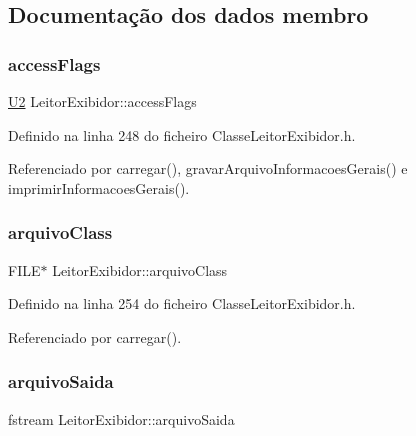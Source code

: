 \subsection{Documentação dos dados membro}
\mbox{\label{classLeitorExibidor_a16d6ecbc6b367cda3c0b774505285665}} 
\subsubsection{\texorpdfstring{access\+Flags}{accessFlags}}
{\footnotesize\ttfamily \hyperlink{BasicTypes_8h_a90240657108b1b457eef9d3f76e0202e}{U2} Leitor\+Exibidor\+::access\+Flags\hspace{0.3cm}{\ttfamily [private]}}



Definido na linha 248 do ficheiro Classe\+Leitor\+Exibidor.\+h.



Referenciado por carregar(), gravar\+Arquivo\+Informacoes\+Gerais() e imprimir\+Informacoes\+Gerais().

\mbox{\label{classLeitorExibidor_acbb3d188113d55cc00b6e92bf2fddb98}} 
\subsubsection{\texorpdfstring{arquivo\+Class}{arquivoClass}}
{\footnotesize\ttfamily F\+I\+LE$\ast$ Leitor\+Exibidor\+::arquivo\+Class\hspace{0.3cm}{\ttfamily [private]}}



Definido na linha 254 do ficheiro Classe\+Leitor\+Exibidor.\+h.



Referenciado por carregar().

\mbox{\label{classLeitorExibidor_ae7f2edb9968df63470901712119e30d2}} 
\subsubsection{\texorpdfstring{arquivo\+Saida}{arquivoSaida}}
{\footnotesize\ttfamily fstream Leitor\+Exibidor\+::arquivo\+Saida\hspace{0.3cm}{\ttfamily [private]}}



